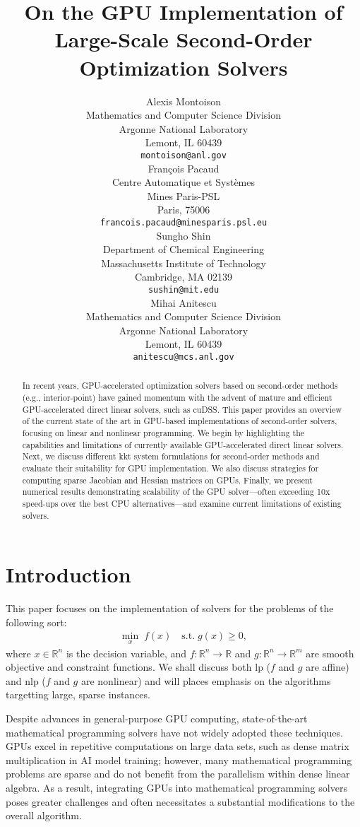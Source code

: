 \documentclass{article}
\title{On the GPU Implementation of Large-Scale Second-Order Optimization Solvers}
\author{%
  Alexis Montoison\\
  Mathematics and Computer Science Division\\
  Argonne National Laboratory\\
  Lemont, IL 60439\\
  \texttt{montoison@anl.gov}\\
  \And
  Fran\c{c}ois Pacaud\\
  Centre Automatique et Systèmes\\
  Mines Paris-PSL\\
  Paris, 75006 \\
  \texttt{francois.pacaud@minesparis.psl.eu}\\
  \And
  Sungho Shin\\
  Department of Chemical Engineering\\
  Massachusetts Institute of Technology\\
  Cambridge, MA 02139\\
  \texttt{sushin@mit.edu}\\
  \And
  Mihai Anitescu\\
  Mathematics and Computer Science Division\\
  Argonne National Laboratory\\
  Lemont, IL 60439\\
  \texttt{anitescu@mcs.anl.gov}\\
}
\begin{document}
\maketitle


\begin{abstract}
In recent years, GPU-accelerated optimization solvers based on second-order methods (e.g., interior-point) have gained momentum with the advent of mature and efficient GPU-accelerated direct linear solvers, such as cuDSS. This paper provides an overview of the current state of the art in GPU-based implementations of second-order solvers, focusing on linear and nonlinear programming. We begin by highlighting the capabilities and limitations of currently available GPU-accelerated direct linear solvers. Next, we discuss different \gls*{kkt} system formulations for second-order methods and evaluate their suitability for GPU implementation. We also discuss strategies for computing sparse Jacobian and Hessian matrices on GPUs. Finally, we present numerical results demonstrating scalability of the GPU solver—often exceeding 10x speed-ups over the best CPU alternatives—and examine current limitations of existing solvers. 
\end{abstract}


\section{Introduction}\label{eqn:intro}

This paper focuses on the implementation of solvers for the problems of the following sort:
\begin{align}\label{eqn:opt}
  \min_{x } \; f(x) \quad \text{s.t.} \; g(x) \geq 0,
\end{align}
where \(x \in \mathbb{R}^n\) is the decision variable, and \(f: \mathbb{R}^n \to \mathbb{R}\) and \(g: \mathbb{R}^n \to \mathbb{R}^m\) are smooth objective and constraint functions.
We shall discuss both \gls*{lp} ($f$ and $g$ are affine) and \gls*{nlp} ($f$ and $g$ are nonlinear) and will places emphasis on the algorithms targetting large, sparse instances.


Despite advances in general-purpose GPU computing, state-of-the-art mathematical programming solvers have not widely adopted these techniques. GPUs excel in repetitive computations on large data sets, such as dense matrix multiplication in AI model training; however, many mathematical programming problems are sparse and do not benefit from the parallelism within dense linear algebra. As a result, integrating GPUs into mathematical programming solvers poses greater challenges and often necessitates a substantial modifications to the overall algorithm.
\end{document}
